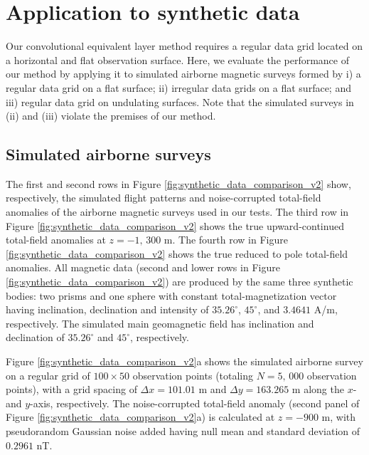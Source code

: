 \documentclass[manuscript]{geophysics}
\begin{document}
\section{Application to synthetic data}

Our convolutional equivalent layer method requires a regular data grid located on a 
horizontal and flat observation surface.
Here, we evaluate the performance of our method by applying it to simulated airborne magnetic 
surveys formed by
i) a regular data grid on a flat surface;
ii) irregular data grids on a flat surface; and 
iii) regular data grid on undulating surfaces.
Note that the simulated surveys in (ii) and (iii) violate the premises of our method. 

\subsection*{Simulated airborne surveys}

The first and second rows in Figure \ref{fig:synthetic_data_comparison_v2} show, respectively, 
the simulated flight patterns and noise-corrupted total-field anomalies of the airborne magnetic 
surveys used in our tests. The third row in Figure \ref{fig:synthetic_data_comparison_v2} shows 
the true upward-continued total-field anomalies at $z = -1, \, 300$ m. The fourth row in Figure \ref{fig:synthetic_data_comparison_v2} shows the true reduced to pole total-field anomalies.
All magnetic data (second and lower rows in Figure \ref{fig:synthetic_data_comparison_v2}) 
are produced by the same three synthetic bodies: two prisms and one sphere with 
constant total-magnetization vector having inclination, declination and intensity of 
$35.26^{\circ}$, $45^{\circ}$, and $3.4641$ A/m, respectively. 
The simulated main geomagnetic field has inclination and declination of $35.26^{\circ}$ and $45^{\circ}$,
respectively. 


Figure \ref{fig:synthetic_data_comparison_v2}a shows the simulated airborne survey on
a regular grid of $100 \times 50$ observation points (totaling  $N = 5,\, 000$ observation points),
with a grid spacing of $\Delta x = 101.01$ m and $\Delta y = 163.265$ m along the
$x$- and $y$-axis, respectively.
The noise-corrupted total-field anomaly (second panel of Figure \ref{fig:synthetic_data_comparison_v2}a) 
is calculated at $z = -900$ m, with pseudorandom Gaussian noise added having null mean and standard deviation of $0.2961$ nT.
\end{document}
